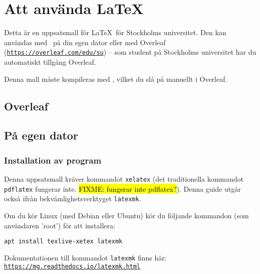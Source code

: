 
\section{Att använda {\rmfamily\LaTeX}}
\label{latex}

Detta är en uppsatsmall för \LaTeX\ för Stockholms universitet. Den kan
användas med \XeLaTeX\ på din egen dator eller med Overleaf
(\texttt{\href{https://overleaf.com/edu/su}{https://\linebreak[0]{}overleaf\linebreak[0]{}.com/\linebreak[0]{}edu/\linebreak[0]{}su}})
-- som student på Stockholms universitet har du automatiskt tillgång Overleaf.

Denna mall måste kompileras med \XeLaTeX, vilket du slå på manuellt i Overleaf.

\subsection{Overleaf}


\subsection{På egen dator}

\subsubsection{Installation av program}

Denna uppsatsmall kräver kommandot \texttt{xelatex} (det traditionella
kommandot \texttt{pdflatex} fungerar inte. \hl{FIXME: fungerar inte
pdflatex?}). Denna guide utgår också ifrån bekvämlighetsverktyget
\texttt{latexmk}.

\noindent Om du kör Linux (med Debian eller Ubuntu) kör du följande kommandon
(som användaren 'root') för att installera:

\begin{verbatim}
apt install texlive-xetex latexmk
\end{verbatim}

\noindent Dokumentationen till kommandot \texttt{latexmk} finns här:
\texttt{\href{https://mg.readthedocs.io/latexmk.html}{https://\linebreak[0]{}mg\linebreak[0]{}.readthedocs\linebreak[0]{}.io/\linebreak[0]{}latexmk\linebreak[0]{}.html}}


